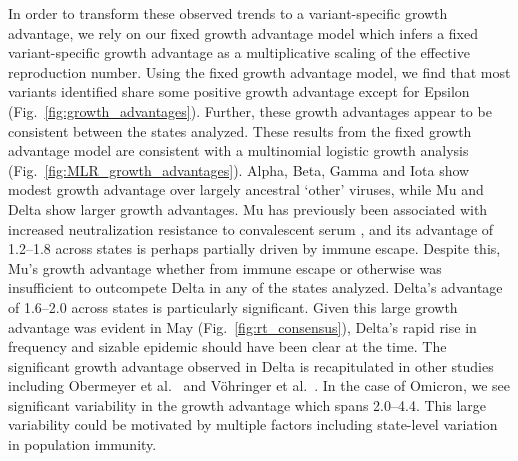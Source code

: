 In order to transform these observed trends to a variant-specific growth advantage, we rely on our fixed growth advantage model which infers a fixed variant-specific growth advantage as a multiplicative scaling of the effective reproduction number.
Using the fixed growth advantage model, we find that most variants identified share some positive growth advantage except for Epsilon (Fig.\ \ref{fig:growth_advantages}).
Further, these growth advantages appear to be consistent between the states analyzed.
These results from the fixed growth advantage model are consistent with a multinomial logistic growth analysis (Fig.\ \ref{fig:MLR_growth_advantages}).
Alpha, Beta, Gamma and Iota show modest growth advantage over largely ancestral `other' viruses, while Mu and Delta show larger growth advantages.
Mu has previously been associated with increased neutralization resistance to convalescent serum \cite{Uriu2021}, and its advantage of 1.2--1.8 across states is perhaps partially driven by immune escape.
Despite this, Mu's growth advantage whether from immune escape or otherwise was insufficient to outcompete Delta in any of the states analyzed.
Delta's advantage of 1.6--2.0 across states is particularly significant.
Given this large growth advantage was evident in May (Fig.\ \ref{fig:rt_consensus}), Delta's rapid rise in frequency and sizable epidemic should have been clear at the time.
The significant growth advantage observed in Delta is recapitulated in other studies including Obermeyer et al.\ \cite{obermeyer2022analysis} and V\"ohringer et al.\ \cite{vohringer2021genomic}.
In the case of Omicron, we see significant variability in the growth advantage which spans 2.0--4.4.
This large variability could be motivated by multiple factors including state-level variation in population immunity.

